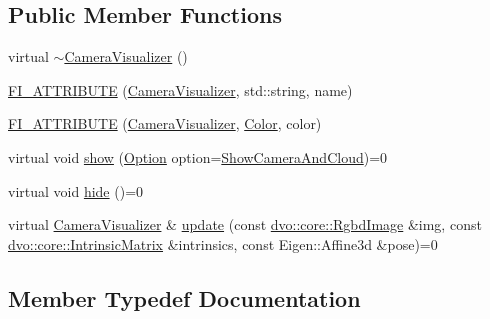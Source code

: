 \subsection*{Public Member Functions}
\begin{DoxyCompactItemize}
\item 
virtual \mbox{\hyperlink{classdvo_1_1visualization_1_1_camera_visualizer_afa7b81b6dd03ee4f79ce9fc55fce5b91}{$\sim$\+Camera\+Visualizer}} ()
\item 
\mbox{\hyperlink{classdvo_1_1visualization_1_1_camera_visualizer_a4c69b0f2b491852a9a639482e5619fb8}{F\+I\+\_\+\+A\+T\+T\+R\+I\+B\+U\+TE}} (\mbox{\hyperlink{classdvo_1_1visualization_1_1_camera_visualizer}{Camera\+Visualizer}}, std\+::string, name)
\item 
\mbox{\hyperlink{classdvo_1_1visualization_1_1_camera_visualizer_a5f834abd240232041d2c87deedae4d3c}{F\+I\+\_\+\+A\+T\+T\+R\+I\+B\+U\+TE}} (\mbox{\hyperlink{classdvo_1_1visualization_1_1_camera_visualizer}{Camera\+Visualizer}}, \mbox{\hyperlink{structdvo_1_1visualization_1_1_color}{Color}}, color)
\item 
virtual void \mbox{\hyperlink{classdvo_1_1visualization_1_1_camera_visualizer_a646b21ea800d07f6a4174c80daf2bf50}{show}} (\mbox{\hyperlink{classdvo_1_1visualization_1_1_camera_visualizer_a0526f50be9f298c4f7d1f91018d50af7}{Option}} option=\mbox{\hyperlink{classdvo_1_1visualization_1_1_camera_visualizer_a0526f50be9f298c4f7d1f91018d50af7a0ff8fc7d7283f27066e93ca0d4ef3f19}{Show\+Camera\+And\+Cloud}})=0
\item 
virtual void \mbox{\hyperlink{classdvo_1_1visualization_1_1_camera_visualizer_a45dbf0d449a7b7529f7da477c676ca85}{hide}} ()=0
\item 
virtual \mbox{\hyperlink{classdvo_1_1visualization_1_1_camera_visualizer}{Camera\+Visualizer}} \& \mbox{\hyperlink{classdvo_1_1visualization_1_1_camera_visualizer_afd83119e63048b0229820045d54c95ec}{update}} (const \mbox{\hyperlink{structdvo_1_1core_1_1_rgbd_image}{dvo\+::core\+::\+Rgbd\+Image}} \&img, const \mbox{\hyperlink{structdvo_1_1core_1_1_intrinsic_matrix}{dvo\+::core\+::\+Intrinsic\+Matrix}} \&intrinsics, const Eigen\+::\+Affine3d \&pose)=0
\end{DoxyCompactItemize}


\subsection{Member Typedef Documentation}
\mbox{\label{classdvo_1_1visualization_1_1_camera_visualizer_a473ebecc62e1d4edba21027d858789a2}} 
